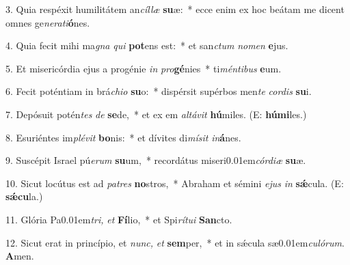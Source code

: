 \item 3. Quia respéxit humilitátem an\textit{cíllæ} \textbf{su}æ:~* ecce enim ex hoc beátam me dicent omnes ge\textit{nerati}\textbf{ó}nes.

\item 4. Quia fecit mihi ma\textit{gna} \textit{qui} \textbf{pot}ens est:~* et san\textit{ctum} \textit{nomen} \textbf{e}jus.

\item 5. Et misericórdia ejus a progénie \textit{in} \textit{pro}\textbf{gé}nies~* ti\textit{méntibus} \textbf{e}um.

\item 6. Fecit poténtiam in brá\textit{chio} \textbf{su}o:~* dispérsit supérbos men\textit{te} \textit{cordis} \textbf{su}i.

\item 7. Depósuit potén\textit{tes} \textit{de} \textbf{se}de,~* et ex em \textit{altávit} \textbf{hú}miles. (E: \textbf{hú}\textbf{mi}les.)

\item 8. Esuriéntes im\textit{plévit} \textbf{bo}nis:~* et dívites di\textit{mísit} \textit{in}\textbf{á}nes.

\item 9. Suscépit Israel pú\textit{erum} \textbf{su}um,~* recordátus miseri\kern 0.01em\textit{córdiæ} \textbf{su}æ.

\item 10. Sicut locútus est ad \textit{patres} \textbf{no}stros,~* Abraham et sémini \textit{ejus} \textit{in}  \textbf{sǽ}cula. (E: \textbf{sǽcu}la.)

\item 11. Glória Pa\kern 0.01em\textit{tri,} \textit{et} \textbf{Fí}lio,~* et Spi\textit{rítui} \textbf{San}cto.

\item 12. Sicut erat in princípio, et \textit{nunc,} \textit{et} \textbf{sem}per,~* et in sǽcula sæ\kern 0.01em\textit{culórum}. \textbf{A}men.
